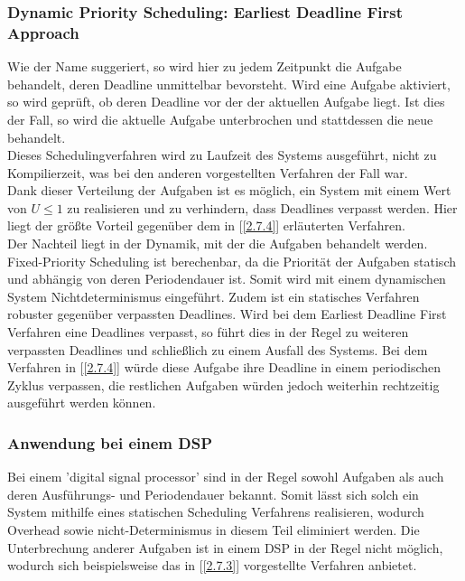 \subsubsection{Dynamic Priority Scheduling: Earliest Deadline First Approach}
Wie der Name suggeriert, so wird hier zu jedem Zeitpunkt die Aufgabe behandelt, deren Deadline unmittelbar bevorsteht. Wird eine Aufgabe aktiviert, so wird geprüft, ob deren Deadline vor der der aktuellen Aufgabe liegt. Ist dies der Fall, so wird die aktuelle Aufgabe unterbrochen und stattdessen die neue behandelt.\\
Dieses Schedulingverfahren wird zu Laufzeit des Systems ausgeführt, nicht zu Kompilierzeit, was bei den anderen vorgestellten Verfahren der Fall war.\\
Dank dieser Verteilung der Aufgaben ist es möglich, ein System mit einem Wert von $U \leq 1$ zu realisieren und zu verhindern, dass Deadlines verpasst werden. Hier liegt der größte Vorteil gegenüber dem in [\ref{2.7.4}] erläuterten Verfahren.\\
Der Nachteil liegt in der Dynamik, mit der die Aufgaben behandelt werden. Fixed-Priority Scheduling ist berechenbar, da die Priorität der Aufgaben statisch und abhängig von deren Periodendauer ist. Somit wird mit einem dynamischen System Nichtdeterminismus eingeführt. Zudem ist ein statisches Verfahren robuster gegenüber verpassten Deadlines. Wird bei dem Earliest Deadline First Verfahren eine Deadlines verpasst, so führt dies in der Regel zu weiteren verpassten Deadlines und schließlich zu einem Ausfall des Systems. Bei dem Verfahren in [\ref{2.7.4}] würde diese Aufgabe ihre Deadline in einem periodischen Zyklus verpassen, die restlichen Aufgaben würden jedoch weiterhin rechtzeitig ausgeführt werden können.

\subsubsection{Anwendung bei einem DSP}
Bei einem 'digital signal processor' sind in der Regel sowohl Aufgaben als auch deren Ausführungs- und Periodendauer bekannt. Somit lässt sich solch ein System mithilfe eines statischen Scheduling Verfahrens realisieren, wodurch Overhead sowie nicht-Determinismus in diesem Teil eliminiert werden\cite{Scheduling}. Die Unterbrechung anderer Aufgaben ist in einem DSP in der Regel nicht möglich, wodurch sich beispielsweise das in [\ref{2.7.3}] vorgestellte Verfahren anbietet.